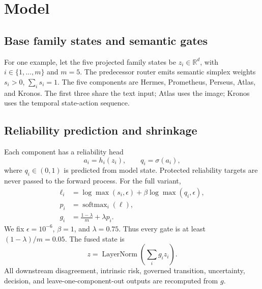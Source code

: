 \documentclass[10pt]{article}
\newcommand{\softmax}{\operatorname{softmax}}
\begin{document}
\section{Model}
\subsection{Base family states and semantic gates}
For one example, let the five projected family states be $z_i\in\mathbb{R}^d$, with
$i\in\{1,\ldots,m\}$ and $m=5$. The predecessor router emits semantic simplex weights
$s_i>0$, $\sum_i s_i=1$. The five components are Hermes, Prometheus, Perseus, Atlas,
and Kronos. The first three share the text input; Atlas uses the image; Kronos uses the
temporal state-action sequence.

\subsection{Reliability prediction and shrinkage}
Each component has a reliability head
\begin{equation}
 a_i=h_i(z_i), \qquad q_i=\sigma(a_i),
\end{equation}
where $q_i\in(0,1)$ is predicted from model state. Protected reliability targets are never
passed to the forward process. For the full variant,
\begin{align}
 \ell_i &= \log\max(s_i,\epsilon)+\beta\log\max(q_i,\epsilon),\\
 p_i &= \softmax_i(\ell),\\
 g_i &= \frac{1-\lambda}{m}+\lambda p_i.
\end{align}
We fix $\epsilon=10^{-6}$, $\beta=1$, and $\lambda=0.75$. Thus every gate is at least
$(1-\lambda)/m=0.05$. The fused state is
\begin{equation}
 z=\operatorname{LayerNorm}\left(\sum_i g_i z_i\right).
\end{equation}
All downstream disagreement, intrinsic risk, governed transition, uncertainty, decision,
and leave-one-component-out outputs are recomputed from $g$.
\end{document}
